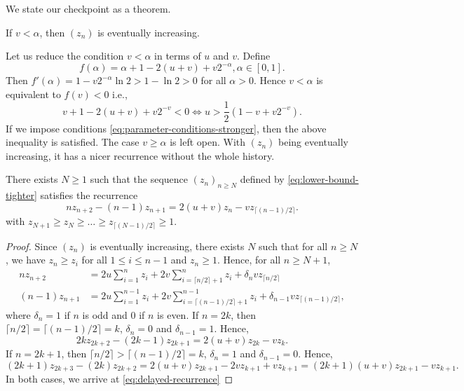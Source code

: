 We state our checkpoint as a theorem.

\begin{theorem}
  \label{thm:eventually-increasing}
  If $v < \alpha$, then $(z_n)$ is eventually increasing.
\end{theorem}

Let us reduce the condition $v < \alpha$ in terms of $u$ and $v$. Define
$$f(\alpha) = \alpha + 1 - 2(u + v) + v 2^{-\alpha}, \alpha\in[0,1].$$
Then $f'(\alpha) = 1 - v2^{-\alpha}\ln2 > 1-\ln2 > 0$ for all $\alpha > 0$. Hence $v < \alpha$ is equivalent to $f(v) < 0$ i.e.,
$$v + 1 - 2(u + v) + v 2^{-v} < 0 \iff u > \frac{1}{2}(1 - v + v 2^{-v}).$$
If we impose conditions \ref{eq:parameter-conditions-stronger}, then the above inequality is satisfied. The case $v\ge \alpha$ is left open. With $(z_n)$ being eventually increasing, it has a nicer recurrence without the whole history.

\begin{lemma}
  There exists $N\ge 1$ such that the sequence $(z_n)_{n\ge N}$ defined by \ref{eq:lower-bound-tighter} satisfies the recurrence
  \begin{equation}
    \label{eq:delayed-recurrence}
    nz_{n+2}-(n-1)z_{n+1} = 2(u+v)z_{n} - vz_{\lceil (n-1)/2\rceil}.
  \end{equation}
  with $z_{N+1} \ge z_{N} \ge \ldots \ge z_{\lceil (N-1)/2\rceil} \ge 1$.
\end{lemma}

\begin{proof}
  Since $(z_n)$ is eventually increasing, there exists $N$ such that for all $n\ge N$, we have $z_n \ge z_i$ for all $1\le i \le n-1$ and $z_n \ge 1$. Hence, for all $n\ge N+1$,
  \begin{align*}
    nz_{n+2}     & = 2u\sum_{i=1}^n z_i + 2v\sum_{i=\lceil n/2\rceil+1}^n z_i + \delta_nvz_{\lceil n/2\rceil}                      \\
    (n-1)z_{n+1} & = 2u\sum_{i=1}^{n-1} z_i + 2v\sum_{i=\lceil (n-1)/2\rceil+1}^{n-1} z_i + \delta_{n-1}vz_{\lceil (n-1)/2\rceil},
  \end{align*}
  where $\delta_n = 1$ if $n$ is odd and $0$ if $n$ is even. If $n=2k$, then $\lceil n/2\rceil = \lceil (n-1)/2\rceil = k$, $\delta_n = 0$ and $\delta_{n-1} = 1$. Hence,
  $$2kz_{2k+2} - (2k-1)z_{2k+1} = 2(u+v)z_{2k} - vz_{k}.$$
  If $n=2k+1$, then $\lceil n/2\rceil > \lceil (n-1)/2\rceil = k$, $\delta_n = 1$ and $\delta_{n-1} = 0$. Hence,
  $$(2k+1)z_{2k+3} - (2k)z_{2k+2} = 2(u+v)z_{2k+1} - 2vz_{k+1} + vz_{k+1} = (2k+1)(u+v)z_{2k+1} - vz_{k+1}.$$
  In both cases, we arrive at \eqref{eq:delayed-recurrence}
\end{proof}

